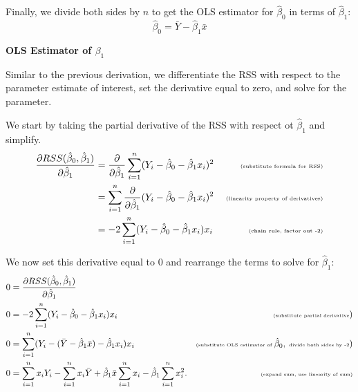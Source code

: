 \documentclass[
]{book}
\theoremstyle{definition}
\theoremstyle{definition}
\theoremstyle{definition}
\theoremstyle{definition}
\theoremstyle{remark}
\begin{document}
Finally, we divide both sides by \(n\) to get the OLS estimator for \(\hat\beta_0\) in terms of \(\hat\beta_1\):
\[
\hat\beta_0 = \bar Y-\hat\beta_1\bar x
\]

\textbf{OLS Estimator of \(\beta_1\)}

Similar to the previous derivation, we differentiate the RSS with respect to the parameter estimate of interest, set the derivative equal to zero, and solve for the parameter.

We start by taking the partial derivative of the RSS with respect ot \(\hat{\beta}_1\) and simplify.
\[
\begin{aligned}
\frac{\partial RSS(\hat\beta_0, \hat\beta_1)}{\partial \hat\beta_1} &= \frac{\partial}{\partial \hat\beta_1}\sum_{i=1}^n (Y_i - \hat\beta_0 - \hat\beta_1x_i)^2 & \tiny\text{ (substitute formula for RSS)} \\
&= \sum_{i=1}^n \frac{\partial}{\partial \hat\beta_1}(Y_i - \hat\beta_0 - \hat\beta_1x_i)^2 & \tiny\text{ (linearity property of derivatives)} \\
&= -2\sum_{i=1}^n(Y_i-\hat\beta_0-\hat\beta_1x_i)x_i & \tiny\text{ (chain rule, factor out -2)}
\end{aligned}
\]

We now set this derivative equal to 0 and rearrange the terms to solve for \(\hat{\beta}_1\):
\[
\begin{aligned}
0 &= \frac{\partial RSS(\hat\beta_0, \hat\beta_1)}{\partial \hat\beta_1} & \\
0 &= -2\sum_{i=1}^n(Y_i-\hat\beta_0-\hat\beta_1x_i)x_i &\tiny\text{(substitute partial derivative})\\
0 &= \sum_{i=1}^n(Y_i-(\bar Y -\hat \beta_1\bar x)-\hat\beta_1x_i)x_i &\tiny\text{(substitute OLS estimator of }\hat\beta_0, \text{ divide both sides by -2}) \\
0 &= \sum_{i=1}^n x_iY_i -\sum_{i=1}^n x_i\bar Y+\hat\beta_1\bar x\sum_{i=1}^n x_i-\hat\beta_1\sum_{i=1}^n x_i^2. &\tiny\text{(expand sum, use linearity of sum)} \\
\end{aligned}
\]
\end{document}
